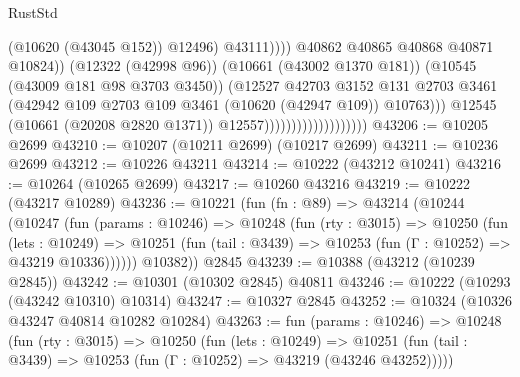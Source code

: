 \begin{lexlean}{RustStd}
\begin{coremodule}
                                                          (@10620 (@43045 @152))
                                                          @12496)
                                                        @43111))))
                                                @40862
                                                @40865
                                                @40868
                                                @40871
                                                @10824))
                                            (@12322 (@42998 @96))
                                            (@10661 (@43002 @1370 @181))
                                            (@10545 (@43009 @181 @98 @3703 @3450))
                                            (@12527
                                              @42703
                                              @3152
                                              @131
                                              @2703
                                              @3461
                                              (@42942
                                                @109
                                                @2703
                                                @109
                                                @3461
                                                (@10620 (@42947 @109))
                                                @10763)))
                                          @12545
                                          (@10661 (@20208 @2820 @1371))
                                          @12557)))))))))))))))))))
@43206 := @10205 @2699
@43210 := @10207 (@10211 @2699) (@10217 @2699)
@43211 := @10236 @2699
@43212 := @10226 @43211
@43214 := @10222 (@43212 @10241)
@43216 := @10264 (@10265 @2699)
@43217 := @10260 @43216
@43219 := @10222 (@43217 @10289)
@43236 := @10221
    (fun (fn : @89) =>
    @43214
      (@10244
        (@10247
          (fun (params : @10246) =>
          @10248
            (fun (rty : @3015) =>
            @10250
              (fun (lets : @10249) =>
              @10251 (fun (tail : @3439) => @10253 (fun (Γ : @10252) => @43219 @10336))))))
        @10382))
    @2845
@43239 := @10388 (@43212 (@10239 @2845))
@43242 := @10301 (@10302 @2845) @40811
@43246 := @10222 (@10293 (@43242 @10310) @10314)
@43247 := @10327 @2845
@43252 := @10324 (@10326 @43247 @40814 @10282 @10284)
@43263 := fun (params : @10246) =>
  @10248
    (fun (rty : @3015) =>
    @10250
      (fun (lets : @10249) =>
      @10251 (fun (tail : @3439) => @10253 (fun (Γ : @10252) => @43219 (@43246 @43252)))))

\end{coremodule}
\end{lexlean}

